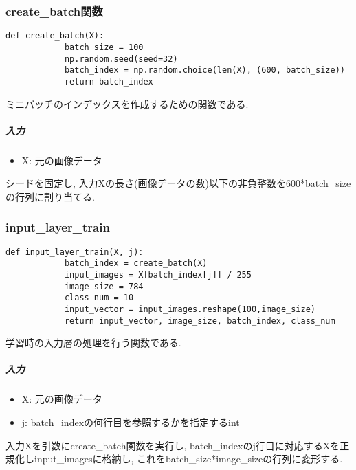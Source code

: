 \documentclass[a4j, titlepage]{jarticle}
\begin{document}
    \subsubsection{create\_batch関数}
        \begin{lstlisting}[caption=ミニバッチを作成,label=fuga]
        def create_batch(X):
            batch_size = 100
            np.random.seed(seed=32)
            batch_index = np.random.choice(len(X), (600, batch_size))
            return batch_index
        \end{lstlisting}
        ミニバッチのインデックスを作成するための関数である.
            \subparagraph*{入力}
            \begin{itemize}
                \item X: 元の画像データ
            \end{itemize}
            シードを固定し, 入力Xの長さ(画像データの数)以下の非負整数を600*batch\_sizeの行列に割り当てる.

    \subsubsection{input\_layer\_train}
        \begin{lstlisting}[caption=学習時の入力層の処理,label=fuga]
        def input_layer_train(X, j):
            batch_index = create_batch(X)
            input_images = X[batch_index[j]] / 255
            image_size = 784
            class_num = 10
            input_vector = input_images.reshape(100,image_size)
            return input_vector, image_size, batch_index, class_num
        \end{lstlisting}
        学習時の入力層の処理を行う関数である.
            \subparagraph*{入力}
            \begin{itemize}
                \item X: 元の画像データ
                \item j: batch\_indexの何行目を参照するかを指定するint
            \end{itemize}
            入力Xを引数にcreate\_batch関数を実行し, batch\_indexのj行目に対応するXを正規化しinput\_imagesに格納し, これをbatch\_size*image\_sizeの行列に変形する.
\end{document}
